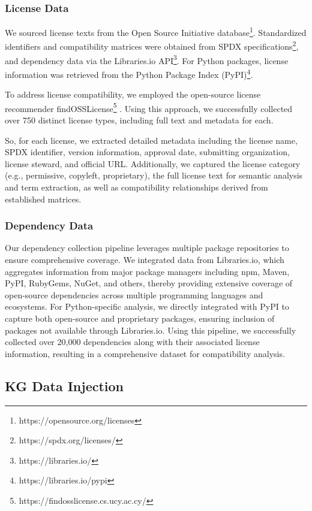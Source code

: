 \subsubsection{License Data}

We sourced license texts from the Open Source Initiative database\footnote{https://opensource.org/licenses}. Standardized identifiers and compatibility matrices were obtained from SPDX specifications\footnote{https://spdx.org/licenses/}, and dependency data via the Libraries.io API\footnote{https://libraries.io/}. For Python packages, license information was retrieved from the Python Package Index (PyPI)\footnote{https://libraries.io/pypi}.

To address license compatibility, we employed the open-source license recommender findOSSLicense\footnote{https://findosslicense.cs.ucy.ac.cy/}
 \cite{KapitsakiC21}. Using this approach, we successfully collected over 750 distinct license types, including full text and metadata for each.

So, for each license, we extracted detailed metadata including the license name, SPDX identifier, version information, approval date, submitting organization, license steward, and official URL. Additionally, we captured the license category (e.g., permissive, copyleft, proprietary), the full license text for semantic analysis and term extraction, as well as compatibility relationships derived from established matrices.

\subsubsection{Dependency Data}

Our dependency collection pipeline leverages multiple package repositories to ensure comprehensive coverage. We integrated data from Libraries.io, which aggregates information from major package managers including npm, Maven, PyPI, RubyGems, NuGet, and others, thereby providing extensive coverage of open-source dependencies across multiple programming languages and ecosystems. For Python-specific analysis, we directly integrated with PyPI to capture both open-source and proprietary packages, ensuring inclusion of packages not available through Libraries.io. Using this pipeline, we successfully collected over 20,000 dependencies along with their associated license information, resulting in a comprehensive dataset for compatibility analysis.


\subsection{KG Data Injection}
\label{sec:KG_Injection}

